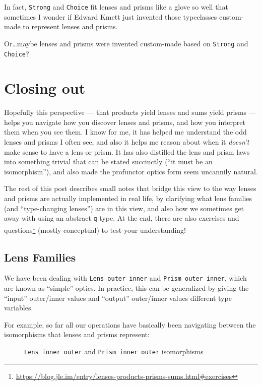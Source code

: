 \documentclass[]{article}
\renewcommand{\href}[2]{#2\footnote{\url{#1}}}
\begin{document}
In fact, \texttt{Strong} and \texttt{Choice} fit lenses and prisms like a glove
so well that sometimes I wonder if Edward Kmett just invented those typeclasses
custom-made to represent lenses and prisms.

Or\ldots maybe lenses and prisms were invented custom-made based on
\texttt{Strong} and \texttt{Choice}?

\section{Closing out}\label{closing-out}

Hopefully this perspective --- that products yield lenses and sums yield prisms
--- helps you navigate how you discover lenses and prisms, and how you interpret
them when you see them. I know for me, it has helped me understand the odd
lenses and prisms I often see, and also it helps me reason about when it
\emph{doesn't} make sense to have a lens or prism. It has also distilled the
lens and prism laws into something trivial that can be stated succinctly (``it
must be an isomorphism''), and also made the profunctor optics form seem
uncannily natural.

The rest of this post describes small notes that bridge this view to the way
lenses and prisms are actually implemented in real life, by clarifying what lens
families (and ``type-changing lenses'') are in this view, and also how we
sometimes get away with using an abstract \texttt{q} type. At the end, there are
also
\href{https://blog.jle.im/entry/lenses-products-prisms-sums.html\#exercises}{exercises
and questions} (mostly conceptual) to test your understanding!

\subsection{Lens Families}\label{lens-families}

We have been dealing with \texttt{Lens\textquotesingle{}\ outer\ inner} and
\texttt{Prism\textquotesingle{}\ outer\ inner}, which are known as ``simple''
optics. In practice, this can be generalized by giving the ``input'' outer/inner
values and ``output'' outer/inner values different type variables.

For example, so far all our operations have basically been navigating between
the isomorphisms that lenses and prisms represent:

\begin{figure}
\centering
{}
\caption{\texttt{Lens\textquotesingle{}\ inner\ outer} and
\texttt{Prism\textquotesingle{}\ inner\ outer} isomorphisms}
\end{figure}
\end{document}
